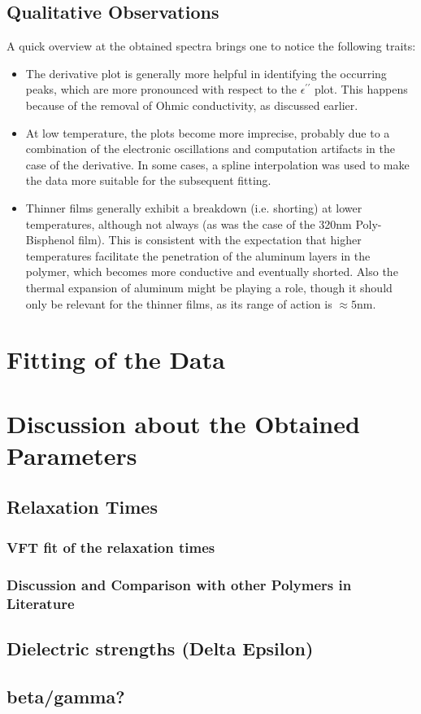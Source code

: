 \subsection{Qualitative Observations}
A quick overview at the obtained spectra brings one to notice the following traits:
\begin{itemize}
	\item{The derivative plot is generally  more helpful in identifying the occurring peaks, which are more pronounced with respect to the $\epsilon^{\prime\prime}$ plot. This happens because of the removal of Ohmic conductivity, as discussed earlier.} %
	\item{At low temperature, the plots become more imprecise, probably due to a combination of the electronic oscillations and computation artifacts in the case of the derivative. In some cases, a spline interpolation was used to make the data more suitable for the subsequent fitting.}
	\item{Thinner films generally exhibit a breakdown (i.e. shorting) at lower temperatures, although not always (as was the case of the 320nm Poly-Bisphenol film). This is consistent with the expectation that higher temperatures facilitate the penetration of the aluminum layers in the polymer, which becomes more conductive and eventually shorted. Also the thermal expansion of aluminum might be playing a role, though it should only be relevant for the thinner films, as its range of action is $\approx 5 \text{nm}$}.
\end{itemize}














\section{Fitting of the Data}
\section{Discussion about the Obtained Parameters}
\subsection{Relaxation Times}
\subsubsection{VFT fit of the relaxation times}
\subsubsection{Discussion and Comparison with other Polymers in Literature}
\subsection{Dielectric strengths (Delta Epsilon)}
\subsection{beta/gamma?}
